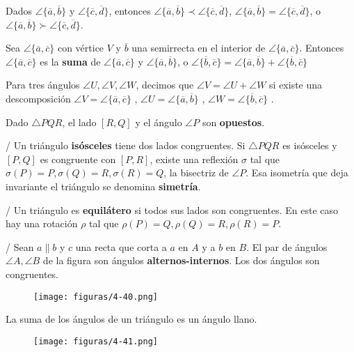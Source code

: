  Dados  $\angle \{\overline{a}, \overline{b} \}$ y  $\angle \{\overline{c}, \overline{d} \}$, entonces  $\angle \{\overline{a}, \overline{b}\} \prec \angle \{\overline{c}, \overline{d} \}$,  $\angle \{\overline{a}, \overline{b}\} = \angle \{\overline{c}, \overline{d} \}$, o  $\angle \{\overline{a}, \overline{b}\} \succ \angle \{\overline{c}, \overline{d} \}$.

 Sea  $\angle \{\overline{a}, \overline{c} \}$ con vértice $V$ y $\overline{b}$ una semirrecta en el interior de $\angle \{\overline{a}, \overline{c} \}$. Entonces $\angle \{\overline{a}, \overline{c} \}$ es la \textbf{suma} de $\angle \{\overline{a}, \overline{c} \}$ y $\angle \{\overline{a}, \overline{b} \}$, o $\angle \{\overline{b}, \overline{c} \}=\angle \{\overline{a}, \overline{b} \}+\angle \{\overline{b}, \overline{c} \}$

 Para tres ángulos $\angle U, \angle V, \angle W$, decimos que $\angle V = \angle U  + \angle W$ si existe una descomposición $\angle V = \angle \{\overline{a}, \overline{c} \}$ ,  $\angle U = \angle \{\overline{a}, \overline{b} \}$ ,  $\angle W = \angle \{\overline{b}, \overline{c} \}$ .

 Dado $\triangle PQR$, el lado $[R, Q]$ y el ángulo $\angle P$ son \textbf{opuestos}.

 /  Un triángulo \textbf{isósceles} tiene dos lados congruentes. Si $\triangle PQR$ es isósceles y $[P,Q]$ es congruente con $[P,R]$, existe una reflexión $\sigma$ tal que $\sigma(P) = P, \sigma(Q) = R, \sigma(R) = Q$, la bisectriz de $\angle P$. Esa isometría que deja invariante el triángulo se denomina \textbf{simetría}.

 /  Un triángulo es \textbf{equilátero} si todos sus lados son congruentes. En este caso hay una rotación $\rho$ tal que $\rho(P) = Q, \rho(Q) = R, \rho(R) = P$.

 /  Sean $a \parallel b$ y $c$ una recta que corta a $a$ en $A$ y a $b$ en $B$. El par de ángulos $\angle A, \angle B$ de la figura son ángulos \textbf{alternos-internos}.
Los dos ángulos son congruentes.
\begin{figure}[H]
	\centering
	\texttt{[image: figuras/4-40.png]}
	\vspace{-1em}
\end{figure}

 La suma de los ángulos de un triángulo es un ángulo llano.

\begin{figure}[H]
	\centering
	\texttt{[image: figuras/4-41.png]}
	\vspace{-1em}
\end{figure}










